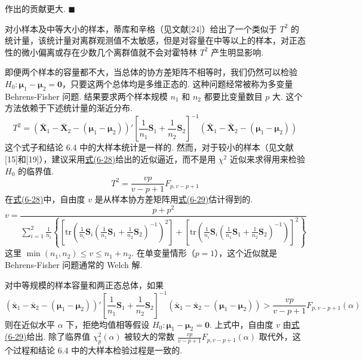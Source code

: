 作出的贡献更大. \hfill$\blacksquare$

对小样本及中等大小的样本，蒂库和辛格（见文献[24]）给出了一个类似于 $T^2$ 的统计量，该统计量对离群观测值不太敏感，但是对容量在中等以上的样本，对正态性的微小偏离或存在少数几个离群值就不会对霍特林 $T^2$ 产生明显影响.


即便两个样本的容量都不大，当总体的协方差矩阵不相等时，我们仍然可以检验 $H_0: \boldsymbol{\mu}_1-\boldsymbol{\mu}_2=\mathbf{0}$，只要这两个总体均是多维正态的. 这种问题经常被称为多变量 Behrens-Fisher 问题. 结果要求两个样本规模 $n_1$ 和 $n_2$ 都要比变量数目 $p$ 大. 这个方法依赖于下述统计量的渐近分布.
\label{eq:6-27}
\begin{equation}
T^2=(\bar{\mathbf{X}}_1-\bar{\mathbf{X}}_2-(\boldsymbol{\mu}_1-\boldsymbol{\mu}_2))'\left[\frac{1}{n_1}\mathbf{S}_1+\frac{1}{n_2}\mathbf{S}_2\right]^{-1}(\bar{\mathbf{X}}_1-\bar{\mathbf{X}}_2-(\boldsymbol{\mu}_1-\boldsymbol{\mu}_2)) \tag{6-27}
\end{equation}
这个式子和结论 6.4 中的大样本统计是一样的. 然而，对于较小的样本（见文献[15]和[19]），建议采用\hyperref[eq:6-28]{式(6-28)}给出的近似逼近，而不是用 $\chi^2$ 近似来求得用来检验 $H_0$ 的临界值.
\label{eq:6-28}
\begin{equation}
T^2=\frac{vp}{v-p+1}F_{p,v-p+1} \tag{6-28}
\end{equation}
在\hyperref[eq:6-28]{式(6-28)}中，自由度 $v$ 是从样本协方差矩阵用\hyperref[eq:6-29]{式(6-29)}估计得到的.
\label{eq:6-29}
\begin{equation}
v=\frac{p+p^2}{\sum\limits_{i=1}^2\frac{1}{n_i}\left\{\left[\mathrm{tr}\left(\frac{1}{n_i}\mathbf{S}_i\left(\frac{1}{n_1}\mathbf{S}_1+\frac{1}{n_2}\mathbf{S}_2\right)^{-1}\right)^2\right]+\left[\mathrm{tr}\left(\frac{1}{n_i}\mathbf{S}_i\left(\frac{1}{n_1}\mathbf{S}_1+\frac{1}{n_2}\mathbf{S}_2\right)^{-1}\right)\right]^2\right\}} \tag{6-29}
\end{equation}
这里 $\min(n_1,n_2)\leqslant v\leqslant n_1+n_2$. 在单变量情形（$p=1$），这个近似就是 Behrens-Fisher 问题通常的 Welch 解.

对中等规模的样本容量和两正态总体，如果
\[
(\bar{\mathbf{x}}_1-\bar{\mathbf{x}}_2-(\boldsymbol{\mu}_1-\boldsymbol{\mu}_2))'\left[\frac{1}{n_1}\mathbf{S}_1+\frac{1}{n_2}\mathbf{S}_2\right]^{-1}(\bar{\mathbf{x}}_1-\bar{\mathbf{x}}_2-(\boldsymbol{\mu}_1-\boldsymbol{\mu}_2))>\frac{vp}{v-p+1}F_{p,v-p+1}(\alpha)
\]
则在近似水平 $\alpha$ 下，拒绝均值相等假设 $H_0: \boldsymbol{\mu}_1-\boldsymbol{\mu}_2=\mathbf{0}$. 上式中，自由度 $v$ 由\hyperref[eq:6-29]{式(6-29)}给出. 除了临界值 $\chi_p^2(\alpha)$ 被较大的常数 $\frac{vp}{v-p+1}F_{p,v-p+1}(\alpha)$ 取代外，这个过程和结论 6.4 中的大样本检验过程是一致的.

